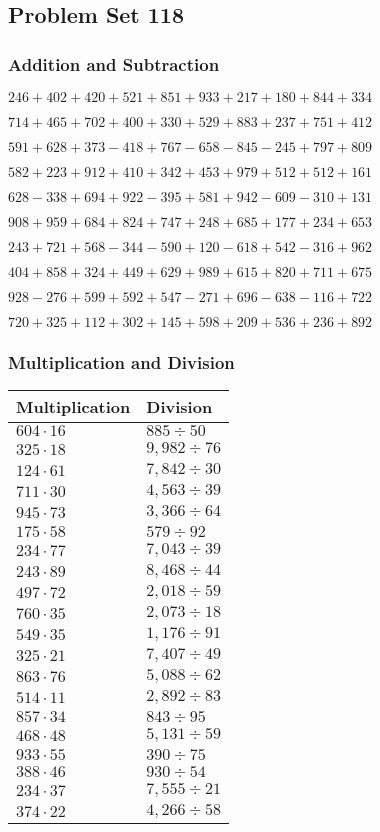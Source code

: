 \hypertarget{problem-set-118}{%
\subsection{Problem Set 118}\label{problem-set-118}}

\hypertarget{addition-and-subtraction}{%
\subsubsection{Addition and
Subtraction}\label{addition-and-subtraction}}

\(246 +402 +420 +521 +851 +933 +217 +180 +844 +334\)

\(714 +465 +702 +400 +330 +529 +883 +237 +751 +412\)

\(591 +628 +373 - 418 +767 - 658 - 845 - 245 +797 +809\)

\(582 +223 +912 +410 +342 +453 +979 +512 +512 +161\)

\(628 - 338 +694 +922 - 395 +581 +942 - 609 - 310 +131\)

\(908 +959 +684 +824 +747 +248 +685 +177 +234 +653\)

\(243 +721 +568 - 344 - 590 +120 - 618 +542 - 316 +962\)

\(404 +858 +324 +449 +629 +989 +615 +820 +711 +675\)

\(928 - 276 +599 +592 +547 - 271 +696 - 638 - 116 +722\)

\(720 +325 +112 +302 +145 +598 +209 +536 +236 +892\)

\hypertarget{multiplication-and-division}{%
\subsubsection{Multiplication and
Division}\label{multiplication-and-division}}

\begin{longtable}[]{@{}ll@{}}
\toprule
Multiplication & Division\tabularnewline
\midrule
\endhead
\(604 \cdot 16\) & \(885÷50\)\tabularnewline
\(325 \cdot 18\) & \(9,982÷76\)\tabularnewline
\(124 \cdot 61\) & \(7,842÷30\)\tabularnewline
\(711 \cdot 30\) & \(4,563÷39\)\tabularnewline
\(945 \cdot 73\) & \(3,366÷64\)\tabularnewline
\(175 \cdot 58\) & \(579÷92\)\tabularnewline
\(234 \cdot 77\) & \(7,043÷39\)\tabularnewline
\(243 \cdot 89\) & \(8,468÷44\)\tabularnewline
\(497 \cdot 72\) & \(2,018÷59\)\tabularnewline
\(760 \cdot 35\) & \(2,073÷18\)\tabularnewline
\(549 \cdot 35\) & \(1,176÷91\)\tabularnewline
\(325 \cdot 21\) & \(7,407÷49\)\tabularnewline
\(863 \cdot 76\) & \(5,088÷62\)\tabularnewline
\(514 \cdot 11\) & \(2,892÷83\)\tabularnewline
\(857 \cdot 34\) & \(843÷95\)\tabularnewline
\(468 \cdot 48\) & \(5,131÷59\)\tabularnewline
\(933 \cdot 55\) & \(390÷75\)\tabularnewline
\(388 \cdot 46\) & \(930÷54\)\tabularnewline
\(234 \cdot 37\) & \(7,555÷21\)\tabularnewline
\(374 \cdot 22\) & \(4,266÷58\)\tabularnewline
\bottomrule
\end{longtable}

